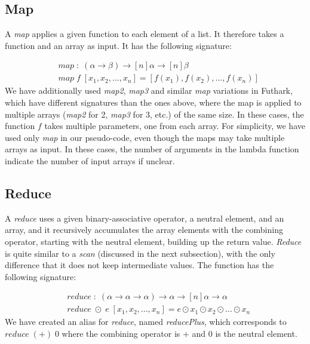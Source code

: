 \subsection{Map}
A \textit{map} applies a given function to each element of a list. It therefore takes a function and an array as input. It has the following signature:

\begin{align}
  \nonumber&\mathit{map}\;:\;(\alpha\rightarrow\beta)\rightarrow [n]\alpha\rightarrow[n]\beta\\
  \nonumber&\mathit{map}\;f\;[x_1,x_2,...,x_n]=[f(x_1),f(x_2),...,f(x_n)]
\end{align}
We have additionally used \textit{map2}, \textit{map3} and similar \textit{map} variations in Futhark, which have different signatures than the ones above, where the map is applied to multiple arrays (\textit{map2} for 2, \textit{map3} for 3, etc.) of the same size. In these cases, the function $f$ takes multiple parameters, one from each array. For simplicity, we have used only \textit{map} in our pseudo-code, even though the maps may take multiple arrays as input. In these cases, the number of arguments in the lambda function indicate the number of input arrays if unclear.   

\subsection{Reduce}
A \textit{reduce} uses a given binary-associative operator, a neutral element, and an array, and it recursively accumulates the array elements with the combining operator, starting with the neutral element, building up the return value. \textit{Reduce} is quite similar to a \textit{scan} (discussed in the next subsection), with the only difference that it does not keep intermediate values. The function has the following signature:

\begin{align}
  \nonumber&\mathit{reduce}\;:\;(\alpha\rightarrow\alpha\rightarrow\alpha)\rightarrow\alpha\rightarrow[n]\alpha\rightarrow\alpha\\
  \nonumber&\mathit{reduce}\;\odot\;e\;[x_1,x_2,...,x_n]=e\odot x_1\odot x_2\odot ...\odot x_n
\end{align}
We have created an alias for \textit{reduce}, named \textit{reducePlus}, which corresponds to $\mathit{reduce}\;(+)\;0$ where the combining operator is $+$ and $0$ is the neutral element.

